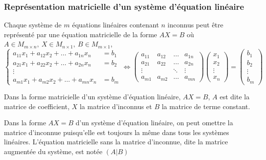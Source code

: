\subsubsection{Représentation matricielle d'un système d'équation linéaire}
\begin{theorem}
    Chaque système de $m$ équations linéaires contenant $n$ inconnus peut être représenté par une équation matricielle de la forme $AX = B$ où $A \in M_{m \times n}, \ X \in M_{n \times 1}, \ B \in M_{m \times 1}$, 
    \[
        \begin{cases}
            a_{11}x_1 + a_{12}x_2 + \ldots + a_{1n}x_n & = b_1 \\
            a_{21}x_1 + a_{22}x_2 + \ldots + a_{2n}x_n & = b_2 \\
            \vdots                                             \\
            a_{m1}x_1 + a_{m2}x_2 + \ldots + a_{mn}x_n & = b_m
        \end{cases} \iff \begin{pmatrix}
            a_{11} & a_{12}      & \dots  & a_{1n} \\
            a_{21} & a_{22}      & \dots  & a_{2n} \\
            \vdots & \phantom{a} & \ddots & \vdots \\
            a_{m1} & a_{m2}      & \dots  & a_{mn}
        \end{pmatrix} \begin{pmatrix}
            x_1    \\
            x_2    \\
            \vdots \\
            x_n
        \end{pmatrix} = \begin{pmatrix}
            b_1    \\
            b_2    \\
            \vdots \\
            b_m
        \end{pmatrix}
    \]
\end{theorem}
\begin{definition}
    Dans la forme matricielle d'un système d'équation linéaire, $AX = B$, $A$ est dite la matrice de coefficient, $X$ la matrice d'inconnus et $B$ la matrice de terme constant.
\end{definition}
\begin{definition}
    Dans la forme $AX = B$ d'un système d'équation linéaire, on peut omettre la matrice d'inconnue puisqu'elle est toujours la même dans tous les systèmes linéaires. L'équation matricielle sans la matrice d'inconnue, dite la matrice augmentée du système, est notée $(A|B)$
\end{definition}

